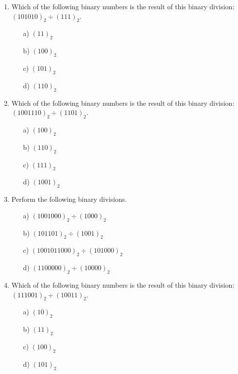 \documentclass[]{article}
\begin{document}
\begin{enumerate}
\item Which of the following binary numbers is the result of this binary division: $(101010)_{2} \div ( 111 )_{2}$. %
\begin{multicols}{2}
\begin{itemize}
\item[a)] $(11)_2$ %
\item[b)] $(100)_{2}$ %
\item[c)] $(101)_{2}$ %
\item[d)] $(110)_{2}$ %
\end{itemize}
\end{multicols}
\item Which of the following binary numbers is the result of this binary division: $(1001110)_{2} \div ( 1101 )_{2}$. %
\begin{multicols}{2}
\begin{itemize}

\item[a)] $(100)_{2}$ %
\item[b)] $(110)_{2}$ %
\item[c)] $(111)_{2}$ %
\item[d)] $(1001)_2$ %
\end{itemize}
\end{multicols}

\item Perform the following binary divisions.
\begin{multicols}{2}
\begin{itemize}
\item[a)] $(1001000)_{2} \div ( 1000)_{2}$
\item[b)] $(101101)_{2} \div (1001)_{2}$
\item[c)] $(1001011000)_{2} \div (101000)_{2}$
\item[d)] $(1100000)_{2} \div (10000)_{2}$
\end{itemize}
\end{multicols}


\item Which of the following binary numbers is the result of this binary division: $(111001)_{2} \div ( 10011)_{2}$. %
\begin{multicols}{2}
\begin{itemize}
\item[a)] $(10)_2$ %
\item[b)] $(11)_{2}$ %
\item[c)] $(100)_{2}$ %
\item[d)] $(101)_{2}$ %
\end{itemize}
\end{multicols}


\end{enumerate}
\end{document}
